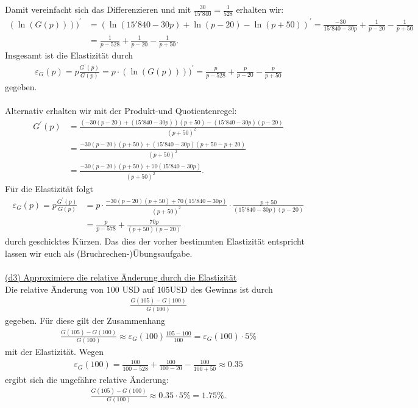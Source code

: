 Damit vereinfacht sich das Differenzieren und  mit $\frac{30}{15'840} = \frac{1}{528}$ erhalten wir:
\begin{align*}
	(\ln(G(p))))^\prime
	&=
	(\ln(15'840 - 30 p) + \ln(p -20) - \ln(p + 50))^\prime
	=
	\frac{-30}{15'840 - 30 p} + \frac{1}{p -20} - \frac{1}{p + 50}\\
	&=
	\frac{1}{p - 528} + \frac{1}{p -20} - \frac{1}{p + 50}.
\end{align*}
Insgesamt ist die Elastizität durch
\begin{align*}
	\varepsilon_{G}(p) = p \frac{G^\prime(p)}{G(p)}
	= p \cdot 	(\ln(G(p))))^\prime 
	=
	\frac{p}{p - 528} + \frac{p}{p -20} - \frac{p}{p + 50}
\end{align*}
gegeben.\\
\\
Alternativ erhalten wir mit der Produkt-und Quotientenregel:
\begin{align*}
	G^\prime(p)
	&=
	\frac{(-30(p-20) + (15'840 - 30 p))(p+50) -(15'840 -30 p)(p-20) }{(p+50 )^2}\\
	&=
	\frac{-30(p-20)(p+50) + (15'840 - 30 p)(p+50- p + 20)}{(p+50 )^2}\\
	&=
	\frac{-30(p-20)(p+50) + 70 (15'840 - 30 p)}{(p+50 )^2}.
\end{align*}
Für die Elastizität folgt
\begin{align*}
	\varepsilon_{G}(p) = p \frac{G^\prime(p)}{G(p)}
	&=
	p \cdot \frac{-30(p-20)(p+50) + 70 (15'840 - 30 p)}{(p+50 )^2} \cdot 
	\frac{p +50}{(15'840 - 30 p)(p-20)}\\
	&=
	\frac{p}{p - 578} + \frac{70p}{(p+50)(p-20)}
\end{align*}
durch geschicktes Kürzen. Das dies der vorher bestimmten Elastizität entspricht lassen wir euch als (Bruchrechen-)Übungsaufgabe.\\
\\
\underline{(d3) Approximiere die relative Änderung durch die Elastizität}\\
Die relative Änderung von $ 100 $ USD auf $ 105 $USD des Gewinns ist durch 
\begin{align*}
	\frac{G(105) -G(100)}{G(100)}
\end{align*}
gegeben. Für diese gilt der Zusammenhang
\begin{align*}
	\frac{G(105) -G(100)}{G(100)}
	\approx
	\varepsilon_{G}(100) \frac{105- 100}{100} = \varepsilon_{G}(100) \cdot 5 \%
\end{align*}
mit der Elastizität.
Wegen 
\begin{align*}
	\varepsilon_{G}(100) = \frac{100}{100 - 528} + \frac{100}{100 - 20} - \frac{100}{100 + 50}
	\approx 0.35
\end{align*}
ergibt sich die ungefähre relative Änderung:
\begin{align*}
	\frac{G(105) -G(100)}{G(100)} \approx 0.35 \cdot 5 \% = 1.75 \%.
\end{align*}




\newpage
